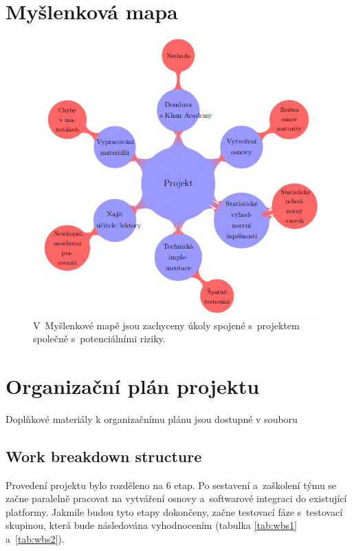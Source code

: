 \documentclass[12pt, a4paper]{report}
\begin{document}
\chapter{Myšlenková mapa}
\label{sec:org0c85e58}

\begin{figure}[htbp]
\centering
\includegraphics[width=.9\linewidth]{./images/myslenkova_mapa.png}
\caption[\textbf{Myšlenková mapa}]{\label{fig:myslenkova_mapa}
V Myšlenkové mapě jsou zachyceny úkoly spojené s projektem společně s potenciálními riziky.}
\end{figure}








\chapter{Organizační plán projektu}
\label{sec:org33b4bba}
Doplňkové materiály k organizačnímu plánu jsou dostupné v souboru \cite{ms_project_soubor}

\section{Work breakdown structure}
\label{sec:org7ea932d}
Provedení projektu bylo rozděleno na 6 etap. Po sestavení a zaškolení týmu se
začne paralelně pracovat na vytváření osnovy a softwarové integraci do
existující platformy. Jakmile budou tyto etapy dokončeny, začne testovací fáze
s testovací skupinou, která bude následována vyhodnocením (tabulka \ref{tab:wbs1}
a \ref{tab:wbs2}).
\end{document}

